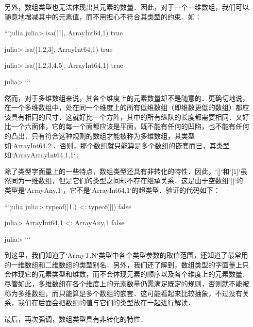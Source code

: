 另外，数组类型也无法体现出其元素的数量．因此，对于一个一维数组，我们可以随意地增减其中的元素值，而不用担心不符合其类型的约束．如：

```julia
julia> isa([1], Array{Int64,1})
true

julia> isa([1,2,3], Array{Int64,1})
true

julia> isa([1,2,3,4,5], Array{Int64,1})
true

julia> 
```

然而，对于多维数组来说，其各个维度上的元素数量却不是随意的．更确切地说，在一个多维数组中，处在同一个维度上的所有低维数组（即维数更低的数组）都应该具有相同的尺寸．这就好比一个方阵，其中的所有纵队的长度都需要相同．又好比一个六面体，它的每一个面都应该是平面，既不能有任何的凹陷，也不能有任何的凸出．只有符合这种规则的数组才能被称为多维数组，其类型如`Array{Int64,2}`．否则，那个数组就只能算是多个数组的嵌套而已，其类型如`Array{Array{Int64,1},1}`．

除了类型字面量上的一些特点，数组类型还具有非转化的特性．因此，`[]`和`[1]`虽然同为一维数组，但是它们的类型之间却不存在继承关系．这是由于空数组`[]`的类型是`Array{Any,1}`，它不是`Array{Int64,1}`的超类型．验证的代码如下：

```julia
julia> typeof([1]) <: typeof([])
false

julia> Array{Int64,1} <: Array{Any,1}
false

julia> 
```

到这里，我们知道了`Array{T,N}`类型中各个类型参数的取值范围，还知道了最常用的一维数组和二维数组的类型别名．另外，我们还了解到，数组类型的字面量上只会体现它的元素类型和维数，而不会体现元素的顺序以及各个维度上的元素数量．尽管如此，多维数组在各个维度上的元素数量仍需满足既定的规则，否则就不能被称为多维数组，而只能算是多个数组的嵌套．这可能看起来比较抽象，不过没有关系，我们在后面会把数组的值与它们的类型放在一起进行解读．

最后，再次强调，数组类型具有非转化的特性．